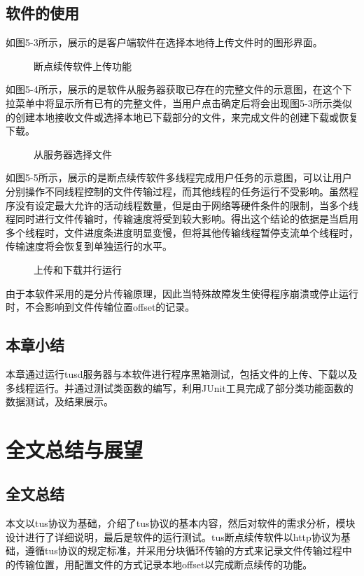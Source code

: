 \documentclass[bachelor]{thesis-uestc}
\begin{document}
\section{软件的使用}
如图5-3所示，展示的是客户端软件在选择本地待上传文件时的图形界面。
\begin{figure}[h]
\caption{断点续传软件上传功能}
\end{figure}
\par 如图5-4所示，展示的是软件从服务器获取已存在的完整文件的示意图，在这个下拉菜单中将显示所有已有的完整文件，当用户点击确定后将会出现图5-3所示类似的创建本地接收文件或选择本地已下载部分的文件，来完成文件的创建下载或恢复下载。
\begin{figure}[h]
\caption{从服务器选择文件}
\end{figure}
\par 如图5-5所示，展示的是断点续传软件多线程完成用户任务的示意图，可以让用户分别操作不同线程控制的文件传输过程，而其他线程的任务运行不受影响。虽然程序没有设定最大允许的活动线程数量，但是由于网络等硬件条件的限制，当多个线程同时进行文件传输时，传输速度将受到较大影响。得出这个结论的依据是当启用多个线程时，文件进度条进度明显变慢，但将其他传输线程暂停支流单个线程时，传输速度将会恢复到单独运行的水平。
\begin{figure}[h]
\caption{上传和下载并行运行}
\end{figure}
\par 由于本软件采用的是分片传输原理，因此当特殊故障发生使得程序崩溃或停止运行时，不会影响到文件传输位置offset的记录。


\section{本章小结}
本章通过运行tusd服务器与本软件进行程序黑箱测试，包括文件的上传、下载以及多线程运行。并通过测试类函数的编写，利用JUnit工具完成了部分类功能函数的数据测试，及结果展示。

\chapter{全文总结与展望}

\section{全文总结}
本文以tus协议为基础，介绍了tus协议的基本内容，然后对软件的需求分析，模块设计进行了详细说明，最后是软件的运行测试。tus断点续传软件以http协议为基础，遵循tus协议的规定标准，并采用分块循环传输的方式来记录文件传输过程中的传输位置，用配置文件的方式记录本地offset以完成断点续传的功能。
\end{document}
